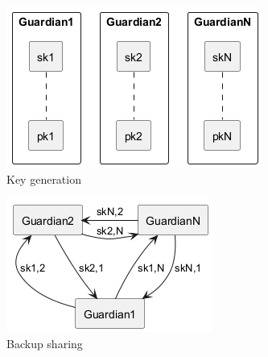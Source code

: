 \begin{figure}[ht!]
    \centering
    \begin{subfigure}{0.3\textwidth}
        \centering
        \includegraphics[width=\textwidth]{abbildungen/Diagramme/keyceremony1.png}
        \caption{Key generation}
        \label{fig:keypair}
    \end{subfigure}
    \hfill
    \begin{subfigure}{0.3\textwidth}
        \centering
        \includegraphics[width=\textwidth]{abbildungen/Diagramme/keyceremony2.png}
        \caption{Backup sharing}
        \label{fig:backup}
    \end{subfigure}
    \hfill
    \begin{subfigure}{0.3\textwidth}
        \centering

\end{subfigure}
\end{figure}
